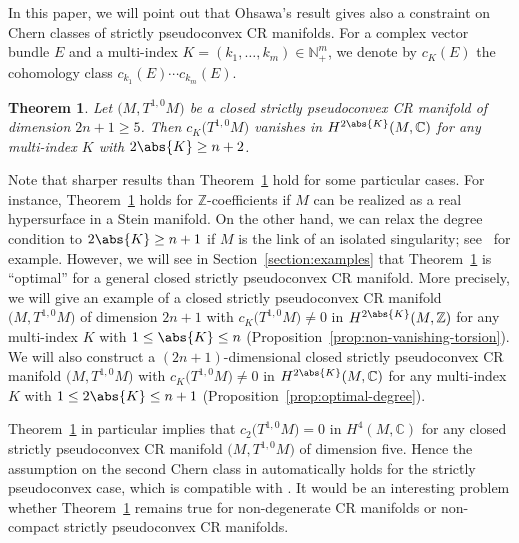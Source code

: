 \documentclass[pdftex]{sigma}
\numberwithin{equation}{section}
\newtheorem{Theorem}{Theorem}[section]
\begin{document}
In this paper, we will point out that Ohsawa's result gives also a constraint on Chern classes of strictly pseudoconvex CR manifolds. For a complex vector bundle $E$ and a multi-index $K = (k_{1}, \dots , k_{m}) \in \mathbb{N}_{+}^{m}$, we denote by $c_{K}(E)$ the cohomology class $c_{k_{1}}(E) \dotsm c_{k_{m}}(E)$.

\begin{Theorem} \label{thm:vanishing-of-Chern-classes}Let $\big(M,T^{1,0} M\big)$ be a closed strictly pseudoconvex CR manifold of dimension $2 n + 1 \geq 5$. Then $c_{K}\big(T^{1,0}M\big)$ vanishes in $H^{2 \abs{K}}(M, \mathbb{C})$ for any multi-index $K$ with $2 \abs{K} \geq n + 2$.
\end{Theorem}

Note that sharper results than Theorem~\ref{thm:vanishing-of-Chern-classes} hold for some particular cases. For instance, Theorem~\ref{thm:vanishing-of-Chern-classes} holds for $\mathbb{Z}$-coefficients if $M$ can be realized as a real hypersurface in a Stein manifold. On the other hand, we can relax the degree condition to $2 \abs{K} \geq n + 1$ if $M$ is the link of an isolated singularity; see~\cite{Kollar13} for example. However, we will see in Section~\ref{section:examples} that Theorem~\ref{thm:vanishing-of-Chern-classes} is ``optimal'' for a general closed strictly pseudoconvex CR manifold. More precisely, we will give an example of a closed strictly pseudoconvex CR manifold $\big(M,T^{1,0} M\big)$ of dimension $2 n + 1$ with $c_{K}\big(T^{1,0}M\big) \neq 0$ in $H^{2 \abs{K}}(M, \mathbb{Z})$ for any multi-index $K$ with $1 \leq \abs{K} \leq n$ (Proposition~\ref{prop:non-vanishing-torsion}). We will also construct a $(2 n + 1)$-dimensional closed strictly pseudoconvex CR manifold $\big(M,T^{1,0} M\big)$ with $c_{K}\big(T^{1,0}M\big) \neq 0$ in $H^{2 \abs{K}}(M, \mathbb{C})$ for any multi-index $K$ with $1 \leq 2\abs{K} \leq n + 1$ (Proposition~\ref{prop:optimal-degree}).

Theorem~\ref{thm:vanishing-of-Chern-classes} in particular implies that $c_{2}\big(T^{1,0}M\big) = 0$ in $H^{4}(M, \mathbb{C})$ for any closed strictly pseudoconvex CR manifold $\big(M,T^{1,0} M\big)$ of dimension five. Hence the assumption on the second Chern class in \cite[Proposition~8.8]{Case-Gover17} automatically holds for the strictly pseudoconvex case, which is compatible with \cite[Theorem~4.6]{Marugame16}. It would be an interesting problem whether Theo\-rem~\ref{thm:vanishing-of-Chern-classes} remains true for non-degenerate CR manifolds or non-compact strictly pseudoconvex CR manifolds.
\end{document}
